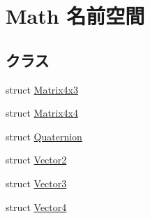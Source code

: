 \hypertarget{namespace_math}{}\section{Math 名前空間}
\label{namespace_math}
\subsection*{クラス}
\begin{DoxyCompactItemize}
\item 
struct \mbox{\hyperlink{struct_math_1_1_matrix4x3}{Matrix4x3}}
\item 
struct \mbox{\hyperlink{struct_math_1_1_matrix4x4}{Matrix4x4}}
\item 
struct \mbox{\hyperlink{struct_math_1_1_quaternion}{Quaternion}}
\item 
struct \mbox{\hyperlink{struct_math_1_1_vector2}{Vector2}}
\item 
struct \mbox{\hyperlink{struct_math_1_1_vector3}{Vector3}}
\item 
struct \mbox{\hyperlink{struct_math_1_1_vector4}{Vector4}}
\end{DoxyCompactItemize}
